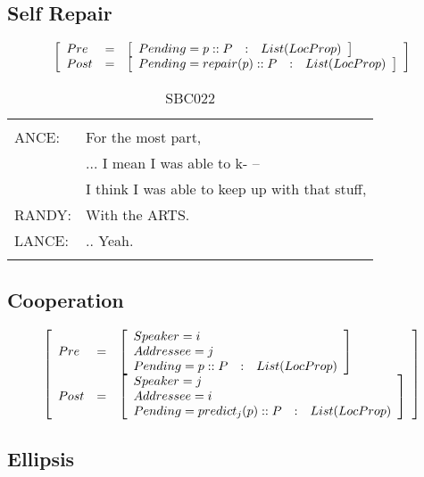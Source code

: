 \documentclass[11pt]{article}
\newenvironment{sbcquote}[2]
{
	\def\savedcaption{\caption{#1}}%
	\def\savedlabel{\label{#2}}%
	\begin{table}[h]
		\centering
		\begin{small}
		\begin{tabular}{ll}
			\hline
			& \\
}
{
	& \\
	\hline
	\end{tabular}
	\end{small}
	\savedcaption
	\savedlabel
\end{table}
}
\newenvironment{recenv}
{\left[\begin{array}{lll}}
{\end{array}\right]}
\begin{document}
			\subsection{Self Repair}
				\begin{equation*}
				\begin{recenv}
				Pre  &=& \begin{recenv}
				Pending = p :: P &:& List(LocProp)\\
				\end{recenv}\\
				Post &=& \begin{recenv}
				Pending = repair(p) :: P &:& List(LocProp)
				\end{recenv}
				\end{recenv}
				\end{equation*}
				\begin{sbcquote}{SBC022}
					LANCE:&	For the most part,\\
					&... I mean I was able to k- --\\
					&I think I was able to keep up with that stuff,\\
					RANDY:&	With the ARTS.\\
					LANCE:&	.. Yeah.\\
				\end{sbcquote}
	
			\subsection{Cooperation}
				\begin{equation*}
				\begin{recenv}
				Pre  &=& \begin{recenv}
				Speaker = i\\
				Addressee = j\\
				Pending = p :: P &:& List(LocProp)\\
				\end{recenv}\\
				Post &=& \begin{recenv}
				Speaker = j\\
				Addressee = i\\
				Pending = predict_j(p) :: P &:& List(LocProp)
				\end{recenv}
				\end{recenv}
				\end{equation*}
			\subsection{Ellipsis}
\end{document}
